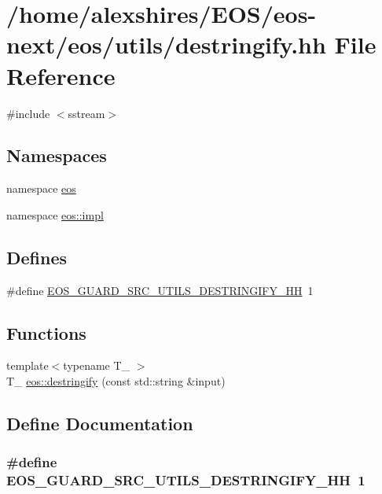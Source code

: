 \hypertarget{destringify_8hh}{
\section{/home/alexshires/EOS/eos-\/next/eos/utils/destringify.hh File Reference}
\label{destringify_8hh}
}
{\ttfamily \#include $<$sstream$>$}\par
\subsection*{Namespaces}
\begin{DoxyCompactItemize}
\item 
namespace \hyperlink{namespaceeos}{eos}
\item 
namespace \hyperlink{namespaceeos_1_1impl}{eos::impl}
\end{DoxyCompactItemize}
\subsection*{Defines}
\begin{DoxyCompactItemize}
\item 
\#define \hyperlink{destringify_8hh_a5ddb52da9553aaff631ac76e53ac5f91}{EOS\_\-GUARD\_\-SRC\_\-UTILS\_\-DESTRINGIFY\_\-HH}~1
\end{DoxyCompactItemize}
\subsection*{Functions}
\begin{DoxyCompactItemize}
\item 
{\footnotesize template$<$typename T\_\- $>$ }\\T\_\- \hyperlink{namespaceeos_ad3134beb65a048a00ed3607d0af90202}{eos::destringify} (const std::string \&input)
\end{DoxyCompactItemize}


\subsection{Define Documentation}
\hypertarget{destringify_8hh_a5ddb52da9553aaff631ac76e53ac5f91}{
\subsubsection[{EOS\_\-GUARD\_\-SRC\_\-UTILS\_\-DESTRINGIFY\_\-HH}]{\setlength{\rightskip}{0pt plus 5cm}\#define EOS\_\-GUARD\_\-SRC\_\-UTILS\_\-DESTRINGIFY\_\-HH~1}}
\label{destringify_8hh_a5ddb52da9553aaff631ac76e53ac5f91}
